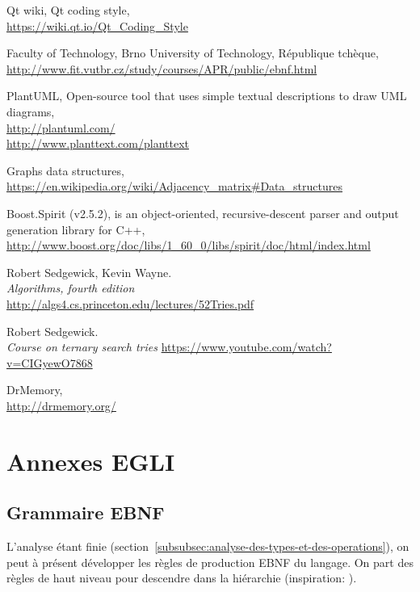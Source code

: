 \documentclass[french]{article}
\begin{document}
	\begin{thebibliography}{9}
		Qt wiki, Qt coding style,\\ \url{https://wiki.qt.io/Qt_Coding_Style}
		
		Faculty of Technology, Brno University of Technology, République tchèque,\\ \url{http://www.fit.vutbr.cz/study/courses/APR/public/ebnf.html}
		
		PlantUML, Open-source tool that uses simple textual descriptions to draw UML diagrams,\\ \url{http://plantuml.com/}\\ \url{http://www.planttext.com/planttext}
		
		Graphs data structures,\\ \url{https://en.wikipedia.org/wiki/Adjacency_matrix#Data_structures}
		
		Boost.Spirit (v2.5.2), is an object-oriented, recursive-descent parser and output generation library for C++,\\ \url{http://www.boost.org/doc/libs/1_60_0/libs/spirit/doc/html/index.html}
		
		Robert Sedgewick, Kevin Wayne.\\
		\emph{Algorithms, fourth edition}\\
		\url{http://algs4.cs.princeton.edu/lectures/52Tries.pdf}
		
		Robert Sedgewick.\\
		\emph{Course on ternary search tries}
		\url{https://www.youtube.com/watch?v=CIGyewO7868}
		
		DrMemory,\\
		\url{http://drmemory.org/}
	\end{thebibliography}
			
	\newpage
	\section{Annexes EGLI}
	\label{sec:annexes-egli}
	
		\subsection{Grammaire EBNF} 
		L'analyse étant finie (section~\ref{subsubsec:analyse-des-types-et-des-operations}), on peut à présent développer les règles de production EBNF du langage. On part des règles de haut niveau pour descendre dans la hiérarchie (inspiration: \cite{vutbr.cz}).\\
		
\end{document}
